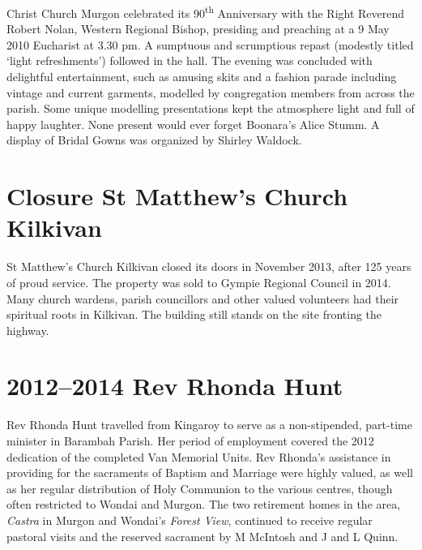 Christ Church Murgon celebrated its 90\textsuperscript{th} Anniversary with the Right Reverend Robert Nolan, Western Regional Bishop, presiding and preaching at a 9 May 2010 Eucharist at 3.30 pm. A sumptuous and scrumptious repast (modestly titled `light refreshments') followed in the hall. The evening was concluded with delightful entertainment, such as amusing skits and a fashion parade including vintage and current garments, modelled by congregation members from across the parish. Some unique modelling presentations kept the atmosphere light and full of happy laughter. None present would ever forget Boonara's Alice Stumm. A display of Bridal Gowns was organized by Shirley Waldock.



\section{Closure St Matthew's Church Kilkivan}



St Matthew's Church Kilkivan closed its doors in November 2013, after 125 years of proud service. The property was sold to Gympie Regional Council in 2014. Many church wardens, parish councillors and other valued volunteers had their spiritual roots in Kilkivan. The building still stands on the site fronting the highway.



\section{2012--2014 Rev Rhonda Hunt}



Rev Rhonda Hunt travelled from Kingaroy to serve as a non-stipended, part-time minister in Barambah Parish. Her period of employment covered the 2012 dedication of the completed Van Memorial Units. Rev Rhonda's assistance in providing for the sacraments of Baptism and Marriage were highly valued, as well as her regular distribution of Holy Communion to the various centres, though often restricted to Wondai and Murgon. The two retirement homes in the area, \emph{Castra} in Murgon and Wondai's \emph{Forest View}, continued to receive regular pastoral visits and the reserved sacrament by M McIntosh and J and L Quinn.









